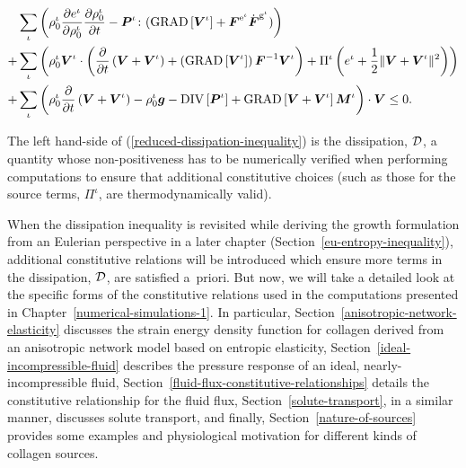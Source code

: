 \begin{equation}
\begin{split}
&\sum\limits_{\iota}\left(\rho^\iota_0\frac{\partial
    e^\iota}{\partial\rho^\iota_0}\frac{\partial
    \rho^\iota_0}{\partial t} -
  \mbox{\boldmath$ P$}^\iota\colon(\mathrm{GRAD}\left[\mbox{\boldmath$ V$}^\iota\right] +
  \mbox{\boldmath$ F$}^{\mathrm{e}^\iota}\dot{\mbox{\boldmath$ F$}}^{\mathrm{g}^\iota})\right)\\ +&
  \sum\limits_{\iota}\left(
  \rho^\iota_0\mbox{\boldmath$ V$}^\iota\cdot\left(\frac{\partial}{\partial t}
  \left(\mbox{\boldmath$ V$}+\mbox{\boldmath$ V$}^\iota\right) +
  \left(\mathrm{GRAD}\left[\mbox{\boldmath$ V$}^\iota\right]\right)
  \mbox{\boldmath$ F$}^{-1}\mbox{\boldmath$ V$}^\iota\right)+\Pi^\iota\left(e^\iota +
  \frac{1}{2}\Vert\mbox{\boldmath$ V$}+\mbox{\boldmath$ V$}^\iota\Vert^2\right)\right)\\+
  &\sum\limits_{\iota} \left(\rho^\iota_0\frac{\partial}{\partial
    t}\left(\mbox{\boldmath$ V$}+\mbox{\boldmath$ V$}^\iota\right) - \rho_0^\iota\mbox{\boldmath$ g$} -
  \mathrm{DIV}\left[\mbox{\boldmath$ P$}^\iota\right] +
  \mathrm{GRAD}\left[\mbox{\boldmath$ V$}+\mbox{\boldmath$ V$}^\iota\right]\mbox{\boldmath$ M$}^\iota\right)\cdot\mbox{\boldmath$ V$} \le
  0.
\label{reduced-dissipation-inequality}
\end{split}
\end{equation}

\noindent The left hand-side of (\ref{reduced-dissipation-inequality})
is the dissipation, ${\mathcal D}$, a quantity whose non-positiveness has to be
numerically verified when performing computations to ensure that
additional constitutive choices (such as those for the source terms,
$\Pi^{\iota}$, are thermodynamically valid).

When the dissipation inequality is revisited while deriving the growth
formulation from an Eulerian perspective in a later chapter
(Section~\ref{eu-entropy-inequality}), additional constitutive
relations will be introduced which ensure more terms in the
dissipation, ${\mathcal D}$, are satisfied a~priori. But now, we will take a
detailed look at the specific forms of the constitutive relations used
in the computations presented in
Chapter~\ref{numerical-simulations-1}. In particular,
Section~\ref{anisotropic-network-elasticity} discusses the strain
energy density function for collagen derived from an anisotropic
network model based on entropic elasticity,
Section~\ref{ideal-incompressible-fluid} describes the pressure
response of an ideal, nearly-incompressible fluid,
Section~\ref{fluid-flux-constitutive-relationships} details the
constitutive relationship for the fluid flux,
Section~\ref{solute-transport}, in a similar manner, discusses solute
transport, and finally, Section~\ref{nature-of-sources} provides some
examples and physiological motivation for different kinds of collagen
sources.

